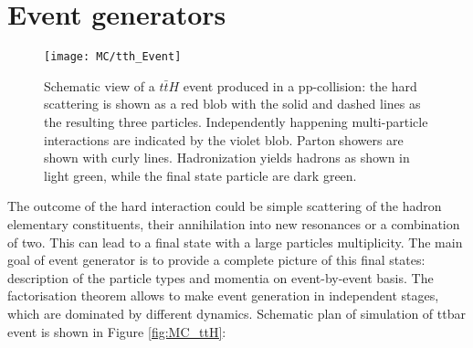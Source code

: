 \section{Event generators}

\begin{figure}[h]
\begin{center}
\texttt{[image: MC/tth\_Event]}
\end{center}
\caption{Schematic view of a $t\bar{t}H$ event produced in a pp-collision: the hard scattering is shown as a red blob with the solid and dashed lines as the resulting three particles.
Independently happening multi-particle interactions are indicated by the violet blob. 
Parton showers are shown with curly lines.
Hadronization yields hadrons as shown in light green, while the final state particle are dark green.
}
\end{figure}

The outcome of the hard interaction could be simple scattering of the hadron elementary constituents, their annihilation into new resonances or a combination of two. This can lead to a final state with a large particles multiplicity. The main goal of event generator is to provide a complete picture of this final states: description of the particle types and momentia on event-by-event basis. The factorisation theorem \cite{Factorisation} allows to make event generation in independent stages, which are dominated by different dynamics. Schematic plan of simulation of ttbar event is shown in Figure \ref{fig:MC_ttH}:

